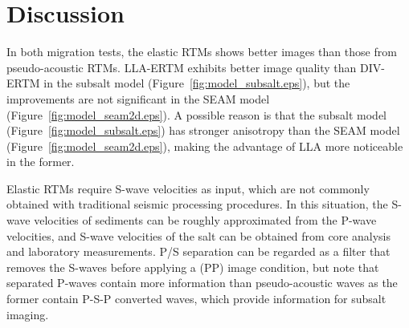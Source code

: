 \documentclass[manuscript,ulem,graphix,revised]{geophysics}
\begin{document}
%

\section{Discussion}
\indent\indent
\marginnote{[24]}In both migration tests, the elastic RTMs shows better images than those from pseudo-acoustic RTMs. LLA-ERTM exhibits better image quality than DIV-ERTM in the subsalt model (Figure~\ref{fig:model_subsalt.eps}), but the improvements are not significant in the SEAM model (Figure~\ref{fig:model_seam2d.eps}). A possible reason is that the subsalt model (Figure~\ref{fig:model_subsalt.eps}) has stronger anisotropy than the SEAM model (Figure~\ref{fig:model_seam2d.eps}), making the advantage of LLA more noticeable in the former. 

Elastic RTMs require S-wave velocities as input, which are not commonly obtained with traditional seismic processing procedures. In this situation, the S-wave velocities of sediments can be roughly approximated from the P-wave velocities, and S-wave velocities of the salt can be obtained from core analysis and laboratory measurements. P/S separation can be regarded as a filter that removes the S-waves before applying a (PP) image condition, but note that separated P-waves contain more information than pseudo-acoustic waves as the former contain P-S-P converted waves, which provide information for subsalt imaging.
\end{document}

